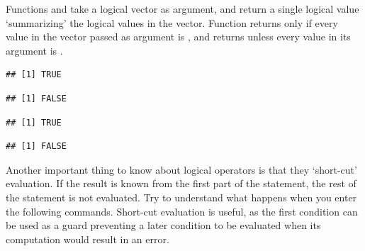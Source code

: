\documentclass[krantz2]{krantz}\usepackage{knitr}%
\begin{document}
Functions  and  take a logical vector as argument, and return a single logical value `summarizing' the logical values in the vector. Function  returns  only if every value in the vector passed as argument is , and  returns  unless every value in its argument is .

\begin{knitrout}\footnotesize
{}\color{fgcolor}\begin{kframe}
\begin{alltt}
\end{alltt}
\begin{verbatim}
## [1] TRUE
\end{verbatim}
\begin{alltt}
\end{alltt}
\begin{verbatim}
## [1] FALSE
\end{verbatim}
\begin{alltt}
 \hlopt{&} 
\end{alltt}
\begin{verbatim}
## [1] TRUE
\end{verbatim}
\begin{alltt}
 \hlopt{&} 
\end{alltt}
\begin{verbatim}
## [1] FALSE
\end{verbatim}
\end{kframe}
\end{knitrout}

Another important thing to know about logical operators is that they `short-cut' evaluation. If the result is known from the first part of the statement, the rest of the statement is not evaluated. Try to understand what happens when you enter the following commands. Short-cut evaluation is useful, as the first condition can be used as a guard preventing a later condition to be evaluated when its computation would result in an error.
\end{document}
